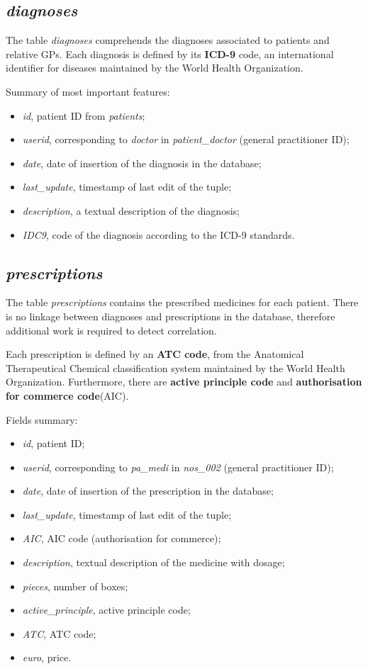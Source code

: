 \subsection{\textit{diagnoses}}
The table \textit{diagnoses} comprehends the diagnoses associated to patients and relative GPs. Each diagnosis is defined by its \textbf{ICD-9} code, an international identifier for diseases maintained by the World Health Organization. 

Summary of most important features:
\begin{itemize}
	\item \textit{id}, patient ID from \textit{patients};
	\item \textit{userid}, corresponding to \textit{doctor} in \textit{patient\_doctor} (general practitioner ID);
	\item \textit{date}, date of insertion of the diagnosis in the database;
	\item \textit{last\_update}, timestamp of last edit of the tuple;
	\item \textit{description}, a textual description of the diagnosis;
	\item \textit{IDC9}, code of the diagnosis according to the ICD-9 standards.
\end{itemize}

\subsection{\textit{prescriptions}}
The table \textit{prescriptions} contains the prescribed medicines for each patient. There is no linkage between diagnoses and prescriptions in the database, therefore additional work is required to detect correlation.

Each prescription is defined by an \textbf{ATC code}, from the Anatomical Therapeutical Chemical classification system maintained by the World Health Organization. Furthermore, there are \textbf{active principle code} and \textbf{authorisation for commerce code}(AIC).

Fields summary:
\begin{itemize}
	\item \textit{id}, patient ID;
	\item \textit{userid}, corresponding to \textit{pa\_medi }in \textit{nos\_002} (general practitioner ID);
	\item \textit{date}, date of insertion of the prescription in the database;
	\item \textit{last\_update}, timestamp of last edit of the tuple;
	\item \textit{AIC}, AIC code (authorisation for commerce);
	\item \textit{description}, textual description of the medicine with dosage;
	\item \textit{pieces}, number of boxes;
	\item \textit{active\_principle}, active principle code;
	\item \textit{ATC}, ATC code;
	\item \textit{euro}, price.
\end{itemize}

